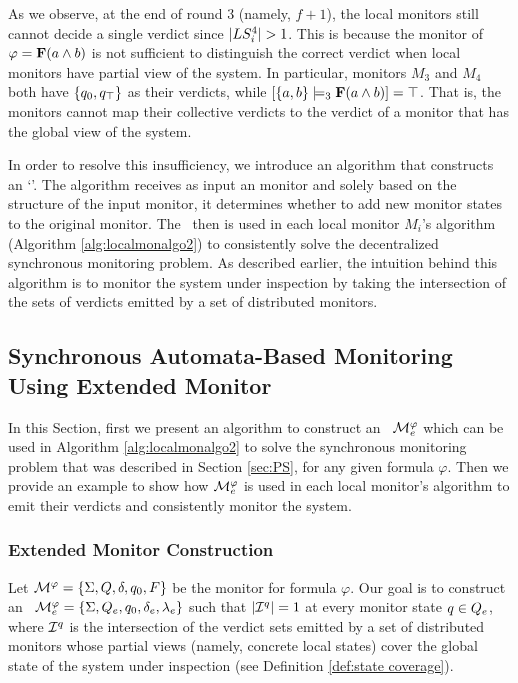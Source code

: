 As we observe, at the end of round $3$ (namely, $f+1$), the local monitors still 
cannot decide a single verdict since $|LS_i^4| > 1$. This is because the 
\LTLtri monitor of $\varphi = \mathbf{F} (a \wedge b)$ is not sufficient to distinguish 
the correct verdict when local monitors have partial view of the system. In 
particular, monitors $M_3$ and $M_4$ both have $\{q_0, 
q_\top\}$ as their verdicts, while $[\{a, b\} \models_3 \mathbf{F}(a 
\wedge b)] = \top$. That is, the monitors cannot map their collective verdicts 
to the verdict of a monitor that has the global view of the system. 


In order to resolve this insufficiency, we introduce an algorithm that 
constructs an `\Exltl'. The algorithm receives as input an \LTLtri monitor and 
solely based on the structure of the input monitor, it determines whether to add 
new monitor states to the original \LTLtri monitor. The \Exltl~then is used in 
each local monitor $M_i$'s algorithm (Algorithm \ref{alg:localmonalgo2}) to 
consistently solve the decentralized synchronous monitoring problem. As 
described earlier, the intuition behind this algorithm is to monitor the system 
under inspection by taking the intersection of the sets of verdicts emitted by a 
set of distributed monitors. 

\subsection{Synchronous Automata-Based Monitoring Using Extended \LTLtri 
Monitor}
\label{sec:SAMExltl}

In this Section, first we present an algorithm to construct an 
\Exltl~$\mathcal{M}_e^\varphi$ which can be used in Algorithm 
\ref{alg:localmonalgo2} to solve the synchronous monitoring problem that was 
described in Section \ref{sec:PS}, for any given \LTL formula $\varphi$. Then 
we provide an example to show how $\mathcal{M}_e^\varphi$ is used in each local 
monitor's algorithm to emit their verdicts and consistently monitor the system.

\subsubsection{Extended \LTLtri Monitor Construction}
\label{sec:ExltlConst}

Let $\mathcal{M}^\varphi=\{\Sigma, Q, \delta, q_0, F\}$ be the \LTLtri 
monitor for \LTL formula $\varphi$. Our goal is to construct an 
\Exltl~$\mathcal{M}_e^\varphi =  \{ \Sigma, Q_e, q_0, \delta_e , 
\lambda_e\}$ such that $|\mathcal{I}^q|=1$ at every monitor state $q \in 
Q_e$, where $\mathcal{I}^q$ is the intersection of the verdict sets emitted by a 
set of distributed monitors whose partial views (namely, concrete local states) 
cover the global state of the system under inspection (see Definition 
\ref{def:state coverage}).

